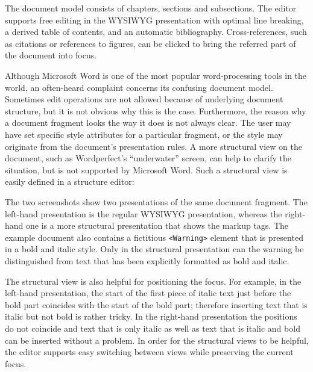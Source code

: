 The document model consists of chapters, sections and subsections. The editor supports free editing in the WYSIWYG presentation with optimal line breaking, a derived table of contents, and an automatic bibliography. Cross-references, such as citations or references to figures, can be clicked to bring the referred part of the document into focus.


Although Microsoft Word is one of the most popular word-processing tools in the world, an often-heard complaint concerns its confusing document model. Sometimes edit operations are not allowed because of underlying document structure, but it is not obvious why this is the case. Furthermore, the reason why a document fragment looks the way it does is not always clear. The user may have set specific style attributes for a particular fragment, or the style may originate from the document's presentation rules. A more structural view on the document, such as Wordperfect's ``underwater'' screen, can help to clarify the situation, but is not supported by Microsoft Word. Such a structural view is easily defined in a structure editor:


The two screenshots show two presentations of the same document fragment. The left-hand presentation is the regular WYSIWYG presentation, whereas the right-hand one is a more structural presentation that shows the markup tags. The example document also contains a fictitious \verb|<Warning>| element that is presented in a bold and italic style. Only in the structural presentation can the warning be distinguished from text that has been explicitly formatted as bold and italic.

The structural view is also helpful for positioning the focus. For example, in the left-hand presentation, the start of the first piece of italic text just before the bold part coincides with the start of the bold part; therefore inserting text that is italic but not bold is rather tricky. In the right-hand presentation the positions do not coincide and text that is only italic as well as text that is italic and bold can be inserted without a problem. In order for the structural views to be helpful, the editor supports easy switching between views while preserving the current focus.

